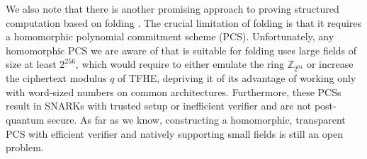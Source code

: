 \documentclass[9pt]{extarticle}
\newcommand{\ints}{\mathds{Z}}
\begin{document}
We also note that there is another promising approach to proving structured computation based on folding \cite{EPRINT:BowGriHop19,C:KotSetTzi22,EPRINT:KotSet22,cryptoeprint:2023/620,C:BCLMS21,TCC:BCMS20,sangria}. The crucial limitation of folding is that it requires a homomorphic polynomial commitment scheme (PCS). Unfortunately, any homomorphic PCS we are aware of that is suitable for folding uses large fields of size at least $ 2^{256}$, which would require to either emulate the ring $\ints_{2^{64}}$ or increase the ciphertext modulus $q$ of TFHE, depriving it of its advantage of working only with word-sized numbers on common architectures. Furthermore, these PCSs result in SNARKs with trusted setup or inefficient verifier and are not post-quantum secure. As far as we know, constructing a homomorphic, transparent PCS with efficient verifier and natively supporting small fields is still an open problem.


%

\end{document}
